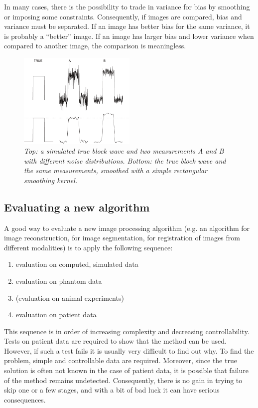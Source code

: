 \documentclass[11pt,oneside]{book}
\begin{document}
In many cases, there is the possibility to trade in variance for bias by
smoothing or imposing some constraints. Consequently, if images are compared,
bias and variance must be separated. If an image has better bias for the same
variance, it is probably a ``better'' image. If an image has larger bias and
lower variance when compared to another image, the comparison is meaningless.

\begin{figure}[tb]
\centering
\includegraphics[width=0.5\textwidth]{figs/fig_bias_var.pdf}
\caption{\label{fig:bias_var} \emph{Top: a simulated true block wave and two
measurements A and B with different noise distributions. Bottom: the true
block wave and the same measurements, smoothed with a simple rectangular
smoothing kernel.}}
\end{figure}

\subsection{Evaluating a new algorithm}
A good way to evaluate a new image processing algorithm (e.g. an algorithm for
image reconstruction, for image segmentation, for registration of images from
different modalities) is to apply the following sequence:
\begin{enumerate}
  \item evaluation on computed, simulated data
  \item evaluation on phantom data
  \item (evaluation on animal experiments)
  \item evaluation on patient data
\end{enumerate}
This sequence is in order of increasing complexity and decreasing
controllability. Tests on patient data are required to show that the method
can be used. However, if such a test fails it is usually very difficult to
find out why. To find the problem, simple and controllable data are required.
Moreover, since the true solution is often not known in the case of patient
data, it is possible that failure of the method remains undetected.
Consequently, there is no gain in trying to skip one or a few stages, and with
a bit of bad luck it can have serious consequences.
\end{document}
